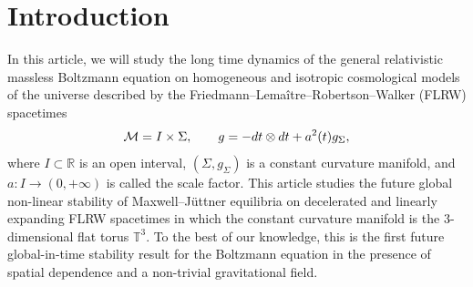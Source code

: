 \documentclass[reqno]{amsart}
\def\R{\mathbb R}
\theoremstyle{definition}
\numberwithin{equation}{section}
\numberwithin{theorem}{section}
\begin{document}
\begin{abstract}
In this work we study the general relativistic massless Boltzmann equation on Friedmann--Lema\^itre--Robertson--Walker spacetimes with spatial topology \(\mathbb{T}^3\) in the linear and decelerated expanding regimes, where the scale factor is \(t^{\mathfrak{q}}\) with \(\mathfrak{q}\in [0,1]\). The massless Boltzmann equation on these backgrounds admits non-stationary Maxwell--J\"uttner equilibria of the form $\exp(- |t^{2\mathfrak{q}}p|)$.   For $0 \leq \mathfrak{q} \leq 1$, we prove future global-in-time existence and uniqueness of small perturbations of these equilibria in the case of hard ball interaction without symmetry assumptions. For $0\leq  \mathfrak{q} < 1/3$, we prove that the perturbation --- measured in a suitable \(L^2_p\) based energy norm --- decays at the superpolynomial time-decay rate of $t^{-3\mathfrak{q}}\exp(-t^{1-3\mathfrak{q}})$, whereas for $1/3< \mathfrak{q} \leq  1$ we obtain the polynomial time-decay rate of $t^{-3\mathfrak{q}}$. In the borderline case \(\mathfrak{q}=1/3\), we show the time-decay of \(t^{-3\mathfrak{q} -c}\) with a uniform constant \(c>0\). Finally, for \(\frac{1}{3}< \mathfrak{q}\leq 1\), we prove future global-in-time existence and uniqueness of small perturbations of the vacuum solution on \(\mathbb{T}^3\).
\end{abstract}









\thispagestyle{empty}


\maketitle
\setcounter{tocdepth}{2}
\tableofcontents







\section{Introduction}

In this article, 
we will study the long time dynamics of the general relativistic massless Boltzmann equation on homogeneous and isotropic cosmological models of the universe described by the Friedmann--Lema\^itre--Robertson--Walker (FLRW) spacetimes
\begin{equation}\notag
\mathcal{M}=I\times \Sigma,\qquad g=-dt\otimes dt+a^2(t)g_{\Sigma},  
\end{equation}
where \(I\subset \R\) is an open interval, \((\Sigma,g_{\Sigma})\) is a constant curvature manifold, and \(a\colon I\to (0,+\infty)\) is called the scale factor.  This article studies the future global non-linear stability of Maxwell--J\"uttner equilibria on decelerated and linearly expanding FLRW spacetimes in which the constant curvature manifold is the 3-dimensional flat torus \(\mathbb{T}^3\). To the best of our knowledge, this is the first future global-in-time stability result for the Boltzmann equation in the presence of spatial dependence and a non-trivial gravitational field.   
\end{document}
